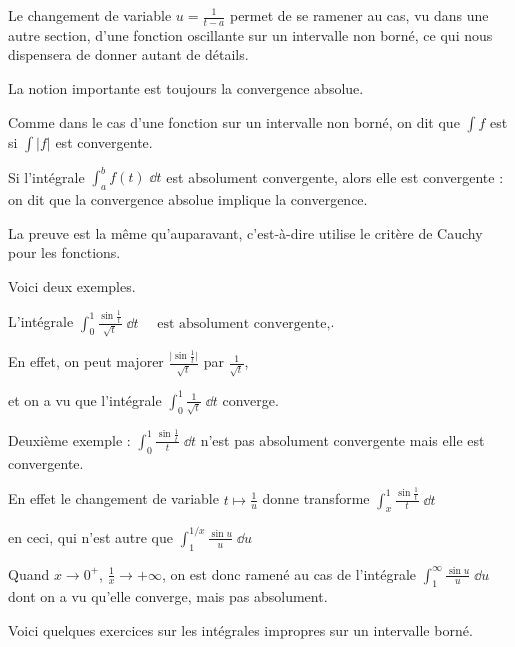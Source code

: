 \change

Le changement de variable $u=\frac{1}{t-a}$ permet de se ramener au cas,
vu dans une autre section, d'une fonction oscillante sur un intervalle non borné, 
ce qui nous dispensera de donner autant de détails.

\diapo

La notion importante est toujours la convergence absolue.

Comme dans le cas d'une fonction sur un intervalle non borné, 
on dit que $\int f$  est  
si $\int \big|f\big|$ est convergente.

\change

Si l'intégrale $\int_a^b f(t)\;\dd t$ est absolument convergente,
alors elle est convergente : on dit que la convergence absolue 
implique la convergence.

La preuve est la même qu'auparavant, c'est-à-dire utilise 
le critère de Cauchy pour les fonctions.

\change

Voici deux exemples.

L'intégrale $\int_0^1 \frac{\sin\frac1t}{\sqrt{t}}\;\dd t
\quad\text{ est absolument convergente,}$. 

\change
En effet, on peut majorer $\frac{\big|\sin\frac1t\big|}{\sqrt{t}}$ 
par $\frac{1}{\sqrt{t}}$, 

\change
et on a vu que l'intégrale $\int_0^1 \frac{1}{\sqrt{t}}\;\dd t$ 
converge.

\change

Deuxième exemple : $\int_0^1 \frac{\sin\frac1t}{t}\;\dd t$ 
n'est pas absolument convergente mais elle est convergente.

\change
En effet  le changement de variable $t\mapsto \frac1u$ donne transforme 
$\int_x^1 \frac{\sin\frac1t}{t}\;\dd t$

en ceci, qui n'est autre que $\int_1^{1/x} \frac{\sin u}{u}\;\dd u$

Quand $x \to 0^+$, $\frac1x \to +\infty$, 
on est donc ramené au cas de l'intégrale 
$\int_1^{\infty} \frac{\sin u}{u}\;\dd u$ dont 
on a vu qu'elle converge, mais pas absolument.


\diapo

Voici quelques exercices sur les intégrales 
impropres sur un intervalle borné.


